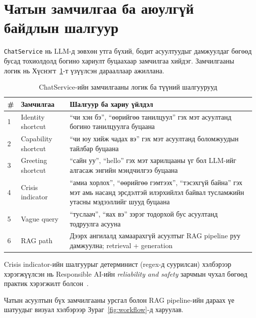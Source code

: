 
\section{Чатын замчилгаа ба аюулгүй байдлын шалгуур}

\texttt{ChatService} нь LLM-д зөвхөн утга бүхий, бодит асуултуудыг дамжуулдаг бөгөөд бусад тохиолдолд богино хариулт буцаахаар замчилгаа хийдэг. Замчилгааны логик нь Хүснэгт~\ref{tab:routing-logic}-т үзүүлсэн дарааллаар ажиллана.

\begin{table}[H]
\centering
\begin{tabular}{|p{0.9cm}|p{3.2cm}|p{9.4cm}|}
\hline
\textbf{\#} & \textbf{Замчилгаа} & \textbf{Шалгуур ба хариу үйлдэл} \\ \hline
1 & Identity shortcut & ``чи хэн бэ'', ``өөрийгөө танилцуул'' гэх мэт асуултанд богино танилцуулга буцаана \\ \hline
2 & Capability shortcut & ``чи юу хийж чадах вэ'' гэх мэт асуултанд боломжуудын тайлбар буцаана \\ \hline
3 & Greeting shortcut & ``сайн уу'', ``hello'' гэх мэт  харилцааны үг бол LLM-ийг алгасаж энгийн мэндчилгээ буцаана \\ \hline
4 & Crisis indicator & ``амиа хорлох'', ``өөрийгөө гэмтээх'', ``тэсэхгүй байна'' гэх мэт амь насанд эрсдэлтэй илэрхийлэл байвал тусламжийн утасны мэдээллийг шууд буцаана \\ \hline
5 & Vague query & ``туслаач'', ``яах вэ'' зэрэг тодорхой бус асуултанд тодруулга асууна \\ \hline
6 & RAG path & Дээрх ангилалд хамаарахгүй асуултыг RAG pipeline руу дамжуулна; retrieval + generation \\ \hline
\end{tabular}
\caption[Чатын замчилгааны логик]{ChatService-ийн замчилгааны логик ба түүний шалгуурууд}
\label{tab:routing-logic}
\end{table}

Crisis indicator-ийн шалгуурыг детерминист (regex-д суурилсан) хэлбэрээр хэрэгжүүлсэн нь Responsible AI-ийн \textit{reliability and safety} зарчмын чухал бөгөөд практик хэрэгжилт болсон~\cite{responsible_ai,nist_ai_rmf}.

Чатын асуултын бүх замчилгааны урсгал болон RAG pipeline-ийн дараах үе шатуудыг визуал хэлбэрээр Зураг~\ref{fig:workflow}-д харуулав.

